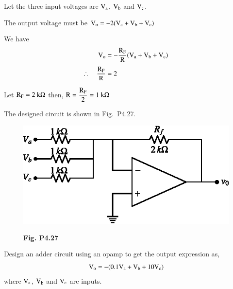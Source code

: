 \begin{solution}
Let the three input voltages are $\textrm{V}_{\textrm{a}}$, $\textrm{V}_{\textrm{b}}$ and $\textrm{V}_{\textrm{c}}$.

\medskip
The output voltage must be $\textrm{V}_{\textrm{o}}=-2(\textrm{V}_{\textrm{a}}+\textrm{V}_{\textrm{b}}+\textrm{V}_{\textrm{c}})$

\medskip
We have 
\begin{align*}
\textrm{V}_{\textrm{o}} &=-\frac{\textrm{R}_{\textrm{F}}}{\textrm{R}}(\textrm{V}_{\textrm{a}}+\textrm{V}_{\textrm{b}}+\textrm{V}_{\textrm{c}})\\[3pt]
\therefore\quad \frac{\textrm{R}_{\textrm{F}}}{\textrm{R}} &= 2
\end{align*}

Let $\textrm{R}_{\textrm{F}}=2~\textrm{k}\Omega$ then, $\textrm{R}=\dfrac{\textrm{R}_{\textrm{F}}}{2}=1~\textrm{k}\Omega$

The designed circuit is shown in Fig.~P4.27.
\begin{figure}[H]
\centering
\includegraphics{chap4/figP4.26.eps}

\smallskip
{\bf Fig. P4.27}
\end{figure}
\end{solution}

\begin{problem}\label{prob4.28}
Design an adder circuit using an opamp to get the output expression as,
$$
\textrm{V}_{\textrm{o}}=-(0.1\textrm{V}_{\textrm{a}}+\textrm{V}_{\textrm{b}}+10\textrm{V}_{\textrm{c}})
$$
where $\textrm{V}_{\textrm{a}}$, $\textrm{V}_{\textrm{b}}$ and $\textrm{V}_{\textrm{c}}$ are inputs.
\end{problem}

